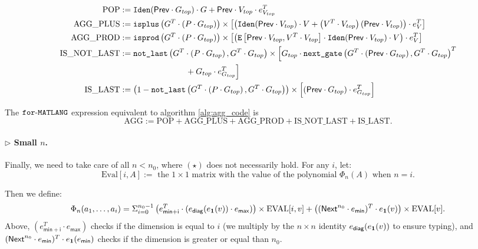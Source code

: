     \begin{align*}
        \text{POP} &:= \texttt{Iden}(\mathsf{Prev}\cdot G_{top})\cdot G + \mathsf{Prev}\cdot V_{top}\cdot e_{V_{top}}^T  \\
        \text{AGG{\_}PLUS} &:= \texttt{isplus}\left( G^T \cdot \left( P \cdot G_{top}\right) \right) \times \left[ \left( \texttt{Iden}(\mathsf{Prev}\cdot V_{top}) \cdot V + \left( V^T \cdot V_{top} \right)\left( \mathsf{Prev}\cdot V_{top} \right)\right) \cdot e_{V}^T \right] \\
        \text{AGG{\_}PROD} &:= \texttt{isprod}\left(G^T \cdot \left( P \cdot G_{top}\right) \right) \times \left[ \left( \texttt{E}\left[ \mathsf{Prev}\cdot V_{top}, V^T \cdot V_{top} \right] \cdot \texttt{Iden}(\mathsf{Prev}\cdot V_{top}) \cdot V \right) \cdot e_{V}^T \right] \\
        \text{IS{\_}NOT{\_}LAST} &:= \texttt{not{\_}last}\left(G^T \cdot \left( P \cdot G_{top}\right),G^T \cdot G_{top} \right) \times \Big[  G_{top} \cdot \texttt{next{\_}gate}\left(G^T \cdot \left( \mathsf{Prev}\cdot G_{top} \right) , G^T \cdot G_{top} \right)^T \\
        &\hspace{8em}+ G_{top}\cdot e_{G_{top}}^T \Big] \\
        \text{IS{\_}LAST} &:= \left( 1 - \texttt{not{\_}last}\left(G^T \cdot \left( P \cdot G_{top}\right),G^T \cdot G_{top} \right) \right)\times \left[ \left( \mathsf{Prev}\cdot G_{top} \right) \cdot e_{G_{top}}^T \right]
    \end{align*}

    The $\texttt{for}\text{-}\texttt{MATLANG}$ expression equivalent to algorithm \ref{alg:agg_code} is $$\text{AGG}:=\text{POP} + \text{AGG{\_}PLUS}+\text{AGG{\_}PROD}+\text{IS{\_}NOT{\_}LAST}+\text{IS{\_}LAST}.$$

  

\paragraph{$\rhd$  Small $n$.}

    Finally, we need to take care of all $n<n_0$, where $(\star)$ does not necessarily hold. For any $i$, let: $$\text{Eval}[i,A]:= \text{ the } 1\times 1 \text{ matrix with the value of the polynomial } \Phi_n(A) \text{ when } n=i.$$

    Then we define: 
    $$
    \Phi_n(a_1,\ldots, a_i)=\Sigma_{i=0}^{n_0-1}\left( e_{\mathsf{min}+\mathsf{i}}^T\cdot (e_{\mathsf{diag}}(e_{\mathbf{1}}(v))\cdot e_{\mathsf{max}}) \right) \times \text{EVAL}[i,v] + \left( (\mathsf{Next}^{n_0}\cdot e_{\mathsf{min}})^T\cdot e_{\mathbf{1}} (v) \right)\times \text{EVAL}[v].
    $$ 
    Above, $(e_{\mathsf{min}+\mathsf{i}}^T\cdot e_{\mathsf{max}})$ checks if the dimension is equal to $i$ (we multiply
    by the $n\times n$ identity $e_{\mathsf{diag}}(e_{\mathbf{1}}(v))$ to ensure typing), 
    and $(\mathsf{Next}^{n_0}\cdot e_{\mathsf{min}})^T\cdot e_{\mathbf{1}} (e_{\mathsf{min}})$ checks if the 
    dimension is greater or equal than $n_0$.



